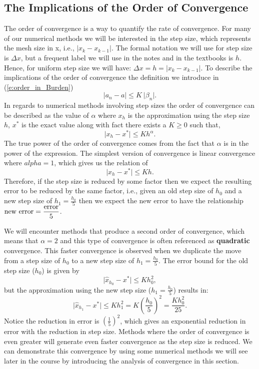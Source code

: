 \documentclass[twoside]{article}
\def\ds{\displaystyle}
\begin{document}
\subsection{The Implications of the Order of Convergence}
The order of convergence is a way to quantify the rate of convergence. For many of our numerical methods we will be interested in the step size, which represents the mesh size in x, i.e.,  $\ds \vert x_k - x_{k-1} \vert$. The formal notation we will use for step size is $\ds \Delta x$, but a frequent label we will use in the notes and in the textbooks is $h$. Hence, for uniform step size we will have: $\ds \Delta x = h = \vert x_k - x_{k-1} \vert$. To describe the implications of the order of convergence the definition we introduce in (\ref{e:order_in_Burden})
$$\vert a_n-a \vert \le K \ \vert \beta_n\vert .$$
In regards to numerical methods involving step sizes the order of convergence can be described as the value of $\alpha$ where $\ds x_h$ is the approximation using the step size $h$, $\ds x^*$ is the exact value along with fact there exists a $K\ge 0 $ such that,
$$\vert  x_h - x^* \vert \le K h^{\alpha}.$$
The true power of the order of convergence comes from the fact that $\alpha$ is in the power of the expression. The simplest version of convergence is linear convergence where $\ds alpha = 1$, which gives us the relation of
$$\vert x_h - x^* \vert \le K h.$$
Therefore, if the step size is reduced by some factor then we expect the resulting error to be reduced by the same factor, i.e., given an old step size of $\ds h_0$ and a new step size of $\ds h_1 = \frac {h_0}5$ then we expect the new error to have the relationship $\ds {\rm new \ error} = \frac {{\rm error}}5$. 

We will encounter methods that produce a second order of convergence, which means that $\ds \alpha = 2$ and this type of convergence is often referenced as {\bf quadratic} convergence. This faster convergence is observed when we duplicate the move from a step size of $\ds h_0$ to a new step size of $\ds h_1 = \frac {h_0}5.$ The error bound for the old step size ($\ds h_0$) is given by 
$$\vert \hat x_{h_0} - x^* \vert \le K h_0^{2},$$
but the approximation using the new step size ($\ds h_1 = \frac {h_0}5$) results in:
$$\vert \hat x_{h_1} - x^* \vert \le K h_1^2 = K \left ( \frac {h_0}5 \right ) ^2 = \frac {Kh_0^2}{25}.$$
Notice the reduction in error is $\ds \left ( \frac 15 \right ) ^ 2$, which gives an exponential reduction in error with the reduction in step size. Methods where the order of convergence is even greater will generate even faster convergence as the step size is reduced. We can demonstrate this convergence by using some numerical methods we will see later in the course by introducing the analysis of convergence in this section. 
\end{document}
